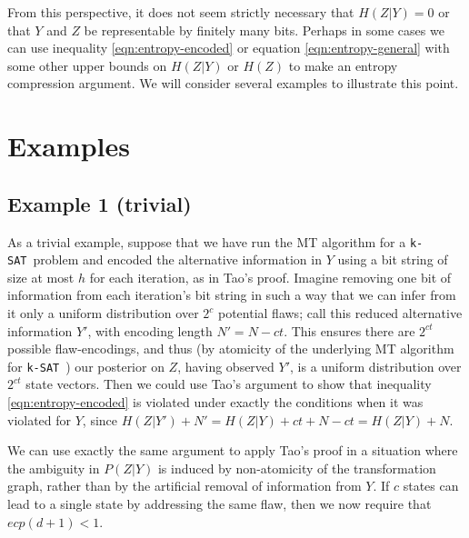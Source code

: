 \documentclass{article}
\newcommand{\ksat}{\texttt{k-SAT}~}
\begin{document}
From this perspective, it does not seem strictly necessary that $H(Z | Y) = 0$ or that $Y$ and $Z$ be representable by finitely many bits.  Perhaps in some cases we can use inequality \ref{eqn:entropy-encoded} or equation \ref{eqn:entropy-general} with some other upper bounds on $H(Z | Y)$ or $H(Z)$ to make an entropy compression argument.  We will consider several examples to illustrate this point.

\section{Examples}
\label{sec:examples}
\subsection{Example 1 (trivial)}
\label{subsec:trivial}
As a trivial example, suppose that we have run the MT algorithm for a \ksat problem and encoded the alternative information in $Y$ using a bit string of size at most $h$ for each iteration, as in Tao's proof.  Imagine removing one bit of information from each iteration's bit string in such a way that we can infer from it only a uniform distribution over $2^c$ potential flaws; call this reduced alternative information $Y'$, with encoding length $N' = N - ct$.  This ensures there are $2^{ct}$ possible flaw-encodings, and thus (by atomicity of the underlying MT algorithm for \ksat) our posterior on $Z$, having observed $Y'$, is a uniform distribution over $2^{ct}$ state vectors.  Then we could use Tao's argument to show that inequality \ref{eqn:entropy-encoded} is violated under exactly the conditions when it was violated for $Y$, since $H(Z | Y') + N' = H(Z | Y) + ct + N - ct = H(Z | Y) + N$.

We can use exactly the same argument to apply Tao's proof in a situation where the ambiguity in $P(Z | Y)$ is induced by non-atomicity of the transformation graph, rather than by the artificial removal of information from $Y$.  If $c$ states can lead to a single state by addressing the same flaw, then we now require that $e c p (d + 1) < 1$.
\end{document}
